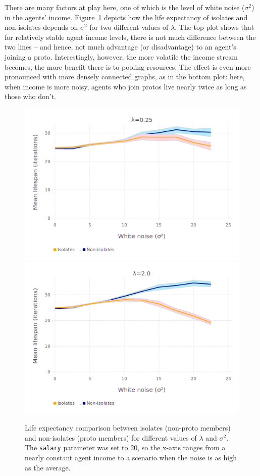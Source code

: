 There are many factors at play here, one of which is the level of white noise
($\sigma^2$) in the agents' income. Figure~\ref{fig:avgLifespanLambda} depicts
how the life expectancy of isolates and non-isolates depends on $\sigma^2$ for
two different values of $\lambda$. The top plot shows that for relatively
stable agent income levels, there is not much difference between the two lines
-- and hence, not much advantage (or disadvantage) to an agent's joining a
proto. Interestingly, however, the more volatile the income stream becomes, the
more benefit there is to pooling resources. The effect is even more pronounced
with more densely connected graphs, as in the bottom plot: here, when income is
more noisy, agents who join protos live nearly twice as long as those who
don't.



\begin{figure}[ht]
\centering
\includegraphics[width=\columnwidth]{figures/avgLifespanLambda_025.png}
\includegraphics[width=\columnwidth]{figures/avgLifespanLambda2.png}
\caption{Life expectancy comparison between isolates (non-proto members) and
non-isolates (proto members) for different values of $\lambda$ and $\sigma^2$.
The \texttt{salary} parameter was set to 20, so the x-axis ranges from a nearly
constant agent income to a scenario when the noise is as high as the average.}
\label{fig:avgLifespanLambda}
\end{figure}


